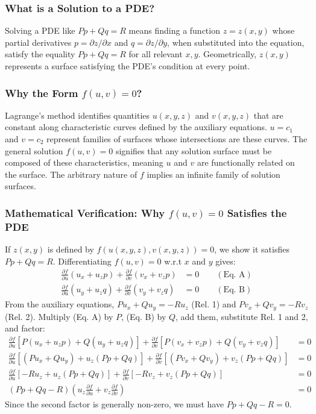 \documentclass{article}
\theoremstyle{remark}
\begin{document}
	\subsubsection{What is a Solution to a PDE?}
	Solving a PDE like $Pp+Qq=R$ means finding a function $z = z(x,y)$ whose partial derivatives $p = \partial z/\partial x$ and $q = \partial z/\partial y$, when substituted into the equation, satisfy the equality $P p + Q q = R$ for all relevant $x, y$. Geometrically, $z(x,y)$ represents a surface satisfying the PDE's condition at every point.
	
	\subsubsection{Why the Form $f(u,v)=0$?}
	Lagrange's method identifies quantities $u(x,y,z)$ and $v(x,y,z)$ that are constant along characteristic curves defined by the auxiliary equations. $u=c_1$ and $v=c_2$ represent families of surfaces whose intersections are these curves. The general solution $f(u,v)=0$ signifies that any solution surface must be composed of these characteristics, meaning $u$ and $v$ are functionally related on the surface. The arbitrary nature of $f$ implies an infinite family of solution surfaces.
	
	\subsubsection{Mathematical Verification: Why $f(u,v)=0$ Satisfies the PDE}
	\label{sec:verification_lagrange_main}
	If $z(x,y)$ is defined by $f(u(x,y,z), v(x,y,z)) = 0$, we show it satisfies $Pp+Qq=R$.
	Differentiating $f(u,v)=0$ w.r.t $x$ and $y$ gives:
	\begin{align*} \frac{\partial f}{\partial u} (u_x + u_z p) + \frac{\partial f}{\partial v} (v_x + v_z p) &= 0 \quad \quad (\text{Eq. A}) \\ \frac{\partial f}{\partial u} (u_y + u_z q) + \frac{\partial f}{\partial v} (v_y + v_z q) &= 0 \quad \quad (\text{Eq. B}) \end{align*}
	From the auxiliary equations, $P u_x + Q u_y = -R u_z$ (Rel. 1) and $P v_x + Q v_y = -R v_z$ (Rel. 2).
	Multiply (Eq. A) by $P$, (Eq. B) by $Q$, add them, substitute Rel. 1 and 2, and factor:
	\begin{align*} \frac{\partial f}{\partial u} [P(u_x + u_z p) + Q(u_y + u_z q)] + \frac{\partial f}{\partial v} [P(v_x + v_z p) + Q(v_y + v_z q)] &= 0 \\ \frac{\partial f}{\partial u} [(P u_x + Q u_y) + u_z (Pp + Qq)] + \frac{\partial f}{\partial v} [(P v_x + Q v_y) + v_z (Pp + Qq)] &= 0 \\ \frac{\partial f}{\partial u} [-R u_z + u_z (Pp + Qq)] + \frac{\partial f}{\partial v} [-R v_z + v_z (Pp + Qq)] &= 0 \\ (Pp + Qq - R) \left( u_z \frac{\partial f}{\partial u} + v_z \frac{\partial f}{\partial v} \right) &= 0 \end{align*}
	Since the second factor is generally non-zero, we must have $Pp + Qq - R = 0$.
	
\end{document}
